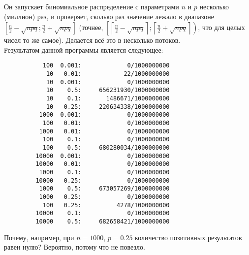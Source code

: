 \documentclass{article}
\begin{document}
    Он запускает биномиальное распределение с параметрами $n$ и $p$ несколько (миллион) раз, и проверяет, сколько раз значение лежало в диапазоне $\left[\frac n2-\sqrt{npq};\frac n2+\sqrt{npq}\right]$ (точнее, $\left[\left\lceil\frac n2-\sqrt{npq}\right\rceil;\left\lceil\frac n2+\sqrt{npq}\right\rceil\right)$, что для целых чисел то же самое). Делается всё это в несколько потоков.\\
    Результатом данной программы является следующее:
    \begin{verbatim}
           100  0.001:             0/1000000000
            10   0.01:            22/1000000000
            10  0.001:             0/1000000000
            10    0.5:     656231930/1000000000
            10    0.1:       1486671/1000000000
            10   0.25:     220634338/1000000000
          1000  0.001:             0/1000000000
           100   0.01:             0/1000000000
          1000   0.01:             0/1000000000
           100    0.1:             0/1000000000
           100    0.5:     680280034/1000000000
         10000  0.001:             0/1000000000
         10000   0.01:             0/1000000000
          1000    0.1:             0/1000000000
         10000   0.25:             0/1000000000
          1000    0.5:     673057269/1000000000
          1000   0.25:             0/1000000000
           100   0.25:          4278/1000000000
         10000    0.1:             0/1000000000
         10000    0.5:     682658421/1000000000
    \end{verbatim}
    Почему, например, при $n=1000$, $p=0.25$ количество позитивных результатов равен нулю? Вероятно, потому что не повезло.
\end{document}
